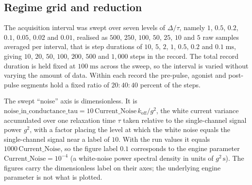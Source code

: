 \subsection*{Regime grid and reduction}

The acquisition interval was swept over seven levels of $\Delta/\tau$, namely
$1$, $0.5$, $0.2$, $0.1$, $0.05$, $0.02$ and $0.01$, realised as
$500$, $250$, $100$, $50$, $25$, $10$ and $5$ raw samples averaged per interval,
that is step durations of $10$, $5$, $2$, $1$, $0.5$, $0.2$ and $0.1\;\mathrm{ms}$,
giving $10$, $20$, $50$, $100$, $200$, $500$ and $1{,}000$ steps in the record.
The total record duration is held fixed at $100\;\mathrm{ms}$ across the sweep, so
the interval is varied without varying the amount of data. Within each record the
pre-pulse, agonist and post-pulse segments hold a fixed ratio of $20{:}40{:}40$
percent of the steps.

The swept ``noise'' axis is dimensionless. It is
$\mathrm{noise\_in\_conductance\_tau} = 10\,\mathrm{Current\_Noise}\,k_{\mathrm{off}}/g^2$,
the white current variance accumulated over one relaxation time $\tau$ taken relative
to the single-channel signal power $g^2$, with a factor placing the level at which
the white noise equals the single-channel signal near a label of $10$. With the run
values it equals $1000\,\mathrm{Current\_Noise}$, so the figure label $0.1$
corresponds to the engine parameter $\mathrm{Current\_Noise} = 10^{-4}$ (a white-noise
power spectral density in units of $g^2\,\mathrm{s}$).
The figures carry the dimensionless label on their axes; the underlying engine
parameter is not what is plotted.

